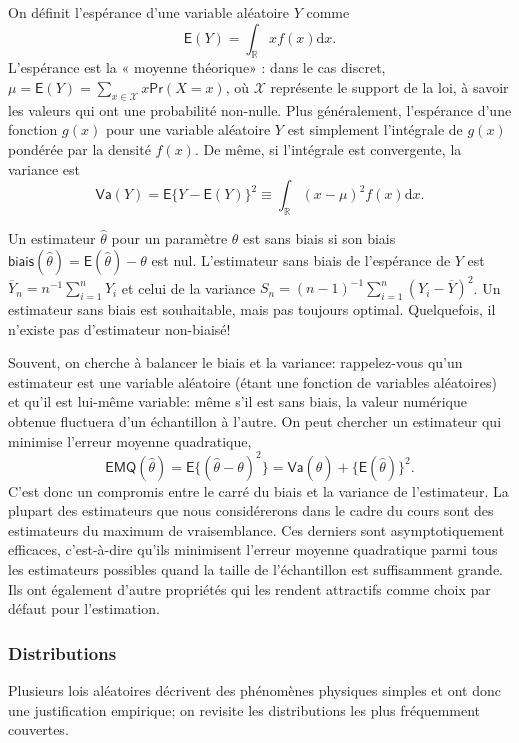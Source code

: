 \documentclass[
  11pt,
  letterpaper,
]{article}
\theoremstyle{definition}
\theoremstyle{definition}
\theoremstyle{definition}
\theoremstyle{definition}
\theoremstyle{remark}
\begin{document}
On définit l'espérance d'une variable aléatoire \(Y\) comme \[\mathsf{E}(Y)=\int_{\mathbb{R}} x f(x) \mathrm{d} x.\]
L'espérance est la « moyenne théorique» : dans le cas discret, \(\mu = \mathsf{E}(Y)=\sum_{x \in \mathcal{X}} x \mathsf{Pr}(X=x)\), où \(\mathcal{X}\) représente le support de la loi, à savoir les valeurs qui ont une probabilité non-nulle. Plus généralement, l'espérance d'une fonction \(g(x)\) pour une variable aléatoire \(Y\) est simplement l'intégrale de \(g(x)\) pondérée par la densité \(f(x)\). De même, si l'intégrale est convergente, la variance est
\[\mathsf{Va}(Y)=\mathsf{E}\{Y-\mathsf{E}(Y)\}^2 \equiv \int_{\mathbb{R}} (x-\mu)^2 f(x) \mathrm{d} x.\]

Un estimateur \(\hat{\theta}\) pour un paramètre \(\theta\) est sans biais si son biais \(\mathsf{biais}(\hat{\theta})=\mathsf{E}(\hat{\theta})- \theta\) est nul.
L'estimateur sans biais de l'espérance de \(Y\) est \(\overline{Y}_n = n^{-1} \sum_{i=1}^n Y_i\) et celui de la variance \(S_n = (n-1)^{-1} \sum_{i=1}^n (Y_i-\overline{Y})^2\). Un estimateur sans biais est souhaitable, mais pas toujours optimal. Quelquefois, il n'existe pas d'estimateur non-biaisé!

Souvent, on cherche à balancer le biais et la variance: rappelez-vous qu'un estimateur est une variable aléatoire (étant une fonction de variables aléatoires) et qu'il est lui-même variable: même s'il est sans biais, la valeur numérique obtenue fluctuera d'un échantillon à l'autre. On peut chercher un estimateur qui minimise l'erreur moyenne quadratique, \[\mathsf{EMQ}(\hat{\theta}) = \mathsf{E}\{(\hat{\theta}-\theta)^2\}=\mathsf{Va}(\hat{\theta}) + \{\mathsf{E}(\hat{\theta})\}^2.\]
C'est donc un compromis entre le carré du biais et la variance de l'estimateur.
La plupart des estimateurs que nous considérerons dans le cadre du cours sont
des estimateurs du maximum de vraisemblance. Ces derniers sont asymptotiquement efficaces, c'est-à-dire qu'ils minimisent l'erreur moyenne quadratique parmi tous les estimateurs possibles quand la taille de l'échantillon est suffisamment grande. Ils ont également d'autre propriétés qui les rendent attractifs comme choix par défaut pour l'estimation.

\hypertarget{distributions}{%
\subsubsection{Distributions}\label{distributions}}

Plusieurs lois aléatoires décrivent des phénomènes physiques simples et ont donc une justification empirique; on revisite les distributions les plus fréquemment couvertes.
\end{document}
